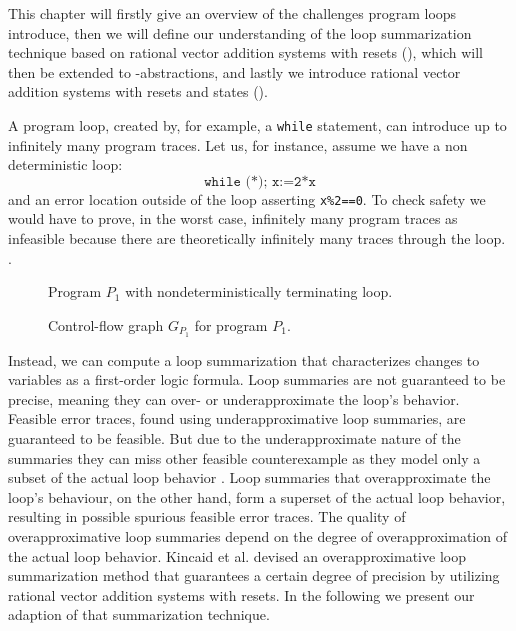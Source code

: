 This chapter will firstly give an overview of the challenges program loops introduce, then we will define our understanding of the loop summarization technique based on rational vector addition systems with resets (\qvasr), which will then be extended to \qvasr-abstractions, and lastly we introduce rational vector addition systems with resets and states (\qvasrs). \\ \par
A program loop, created by, for example, a \texttt{while} statement, can introduce up to infinitely many program traces. Let us, for instance, assume we have a non deterministic loop:
\begin{equation*}
	\texttt{while (*); x:=2*x}
\end{equation*}
and an error location outside of the loop asserting \texttt{x\%2==0}. To check safety we would have to prove, in the worst case, infinitely many program traces as infeasible because there are theoretically infinitely many traces through the loop.
.\begin{center}
	\begin{minipage}[t]{0.4\linewidth}
		\begin{figure}[H]
			\centering
			
			\caption{Program $P_1$ with nondeterministically terminating loop.}
			\label{codeExMotAss}
		\end{figure}
	\end{minipage}
	\hfill
	\begin{minipage}[t]{0.59\linewidth}
		\begin{figure}[H]
			\centering
			
			\caption{Control-flow graph $G_{P_1}$ for program $P_1$.}
			\label{cfgExMotAss}
		\end{figure}
	\end{minipage}
\end{center}
Instead, we can compute a loop summarization that characterizes changes to variables as a first-order logic formula. Loop summaries are not guaranteed to be precise, meaning they can over- or underapproximate the loop's behavior. Feasible error traces, found using underapproximative loop summaries, are guaranteed to be feasible. But due to the underapproximate nature of the summaries they can miss other feasible counterexample as they model only a subset of the actual loop behavior \cite{DBLP:journals/fmsd/KroeningLW15}. Loop summaries that overapproximate the loop's behaviour, on the other hand, form a superset of the actual loop behavior, resulting in possible spurious feasible error traces. The quality of overapproximative loop summaries depend on the degree of overapproximation of the actual loop behavior.
Kincaid et al. \cite{DBLP:conf/cav/SilvermanK19} devised an overapproximative loop summarization method that guarantees a certain degree of precision by utilizing rational vector addition systems with resets. In the following we present our adaption of that summarization technique.
